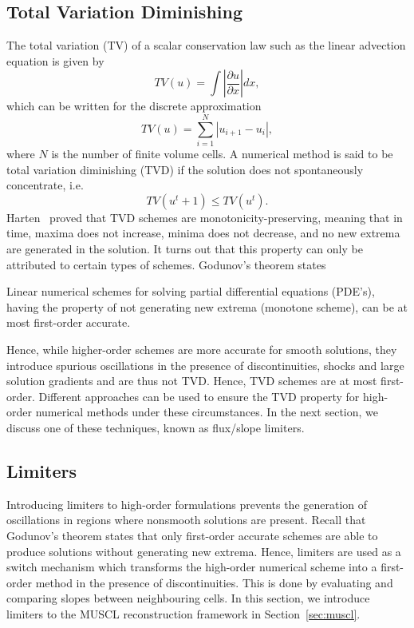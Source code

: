 \subsection{Total Variation Diminishing}
The total variation (TV) of a scalar conservation law such as the linear advection equation is given by~\cite{hirschNumericalComputationInternal2007a}
\begin{equation}
	TV(u) = \int \left|\frac{\partial u }{\partial x}\right|dx,
\end{equation}
which can be written for the discrete approximation 
\begin{equation}
	TV(u) = \sum_{i=1}^N |u_{i+1}-u_i|,
\end{equation}
where $N$ is the number of finite volume cells. A numerical method is said to be total variation diminishing (TVD) if the solution does not spontaneously concentrate, i.e.
\begin{equation}
	TV(u^t+1)\leq TV(u^t).
\end{equation}
Harten~\cite{harten1997high} proved that TVD schemes are monotonicity-preserving, meaning that in time, maxima does not increase, minima does not decrease, and no new extrema are generated in the solution. It turns out that this property can only be attributed to certain types of schemes. Godunov's theorem states~\cite{godunov1954different}
\begin{theorem}
	Linear numerical schemes for solving partial differential equations (PDE's), having the property of not generating new extrema (monotone scheme), can be at most first-order accurate.
\end{theorem}
Hence, while higher-order schemes are more accurate for smooth solutions, they introduce spurious oscillations in the presence of discontinuities, shocks and large solution gradients and are thus not TVD. Hence, TVD schemes are at most first-order. Different approaches can be used to ensure the TVD property for high-order numerical methods under these circumstances. In the next section, we discuss one of these techniques, known as flux/slope limiters.


\subsection{Limiters}
Introducing limiters to high-order formulations prevents the generation of oscillations in regions where nonsmooth solutions are present. Recall that Godunov's theorem states that only first-order accurate schemes are able to produce solutions without generating new extrema. Hence, limiters are used as a switch mechanism which transforms the high-order numerical scheme into a first-order method in the presence of discontinuities. This is done by evaluating and comparing slopes between neighbouring cells. In this section, we introduce limiters to the MUSCL reconstruction framework in Section~\ref{sec:muscl}.


